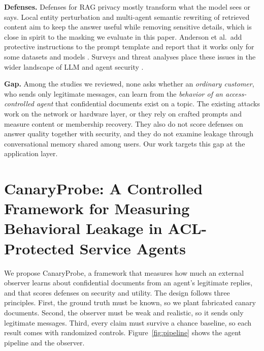 \documentclass[conference]{IEEEtran}
\begin{document}
\textbf{Defenses.} Defenses for RAG privacy mostly transform what the model sees or says. Local entity perturbation \cite{lprag25} and multi-agent semantic rewriting of retrieved content \cite{rewrite26} aim to keep the answer useful while removing sensitive details, which is close in spirit to the masking we evaluate in this paper. Anderson et al.\ add protective instructions to the prompt template and report that it works only for some datasets and models \cite{anderson24}. Surveys and threat analyses place these issues in the wider landscape of LLM and agent security \cite{survey25,agents25}.

\textbf{Gap.} Among the studies we reviewed, none asks whether an \emph{ordinary customer}, who sends only legitimate messages, can learn from the \emph{behavior of an access-controlled agent} that confidential documents exist on a topic. The existing attacks work on the network or hardware layer, or they rely on crafted prompts and measure content or membership recovery. They also do not score defenses on answer quality together with security, and they do not examine leakage through conversational memory shared among users. Our work targets this gap at the application layer.

\section{CanaryProbe: A Controlled Framework for Measuring Behavioral Leakage in ACL-Protected Service Agents}
\label{sec:solution}

We propose CanaryProbe, a framework that measures how much an external observer learns about confidential documents from an agent's legitimate replies, and that scores defenses on security and utility. The design follows three principles. First, the ground truth must be known, so we plant fabricated canary documents. Second, the observer must be weak and realistic, so it sends only legitimate messages. Third, every claim must survive a chance baseline, so each result comes with randomized controls. Figure~\ref{fig:pipeline} shows the agent pipeline and the observer.
\end{document}
